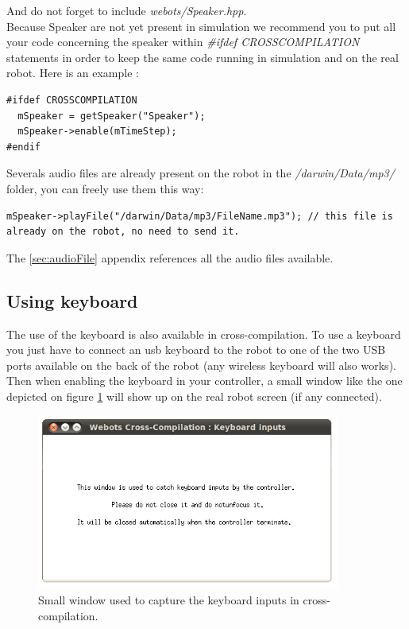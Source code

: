 \documentclass[a4paper, 12pt]{article}  		%
\begin{document}
And do not forget to include \textit{webots/Speaker.hpp}.\\

Because Speaker are not yet present in simulation we recommend you to put all your code concerning the speaker within \textit{\#ifdef CROSSCOMPILATION} statements in order to keep the same code running in simulation and on the real robot. Here is an example :\\
\lstset{language=c++} 
\lstset{commentstyle=\textit} 
\begin{lstlisting} 
#ifdef CROSSCOMPILATION
  mSpeaker = getSpeaker("Speaker");
  mSpeaker->enable(mTimeStep);
#endif
\end{lstlisting}

Severals audio files are already present on the robot in the \textit{/darwin/Data/mp3/} folder, you can freely use them this way:\\
\lstset{language=c++} 
\lstset{commentstyle=\textit} 
\begin{lstlisting} 
mSpeaker->playFile("/darwin/Data/mp3/FileName.mp3"); // this file is already on the robot, no need to send it.
\end{lstlisting}

The \ref{sec:audioFile} appendix references all the audio files available.\\

\newpage
\subsection{Using keyboard}

The use of the keyboard is also available in cross-compilation. To use a keyboard you just have to connect an usb keyboard to the robot to one of the two USB ports available on the back of the robot (any wireless keyboard will also works).\\

Then when enabling the keyboard in your controller, a small window like the one depicted on figure \ref{keyboardWindow} will show up on the real robot screen (if any connected).\\

\begin{figure}[H]
\begin{center}
\includegraphics[width=10cm]{keyboardWindow.png}
\caption{Small window used to capture the keyboard inputs in cross-compilation.}
\label{keyboardWindow}
\end{center}
\end{figure}
\end{document}
